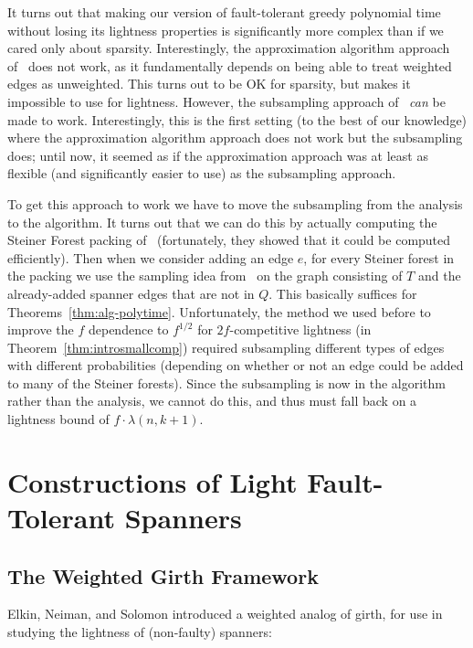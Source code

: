 \documentclass{article}
\theoremstyle{plain}
\theoremstyle{definition}
\begin{document}
It turns out that making our version of fault-tolerant greedy polynomial time without losing its lightness properties is significantly more complex than if we cared only about sparsity.  Interestingly, the approximation algorithm approach of~\cite{DR20} does not work, as it fundamentally depends on being able to treat weighted edges as unweighted.  This turns out to be OK for sparsity, but makes it impossible to use for lightness.  However, the subsampling approach of~\cite{BDR21} \emph{can} be made to work.  Interestingly, this is the first setting (to the best of our knowledge) where the approximation algorithm approach does not work but the subsampling does; until now, it seemed as if the approximation approach was at least as flexible (and significantly easier to use) as the subsampling approach.

To get this approach to work we have to move the subsampling from the analysis to the algorithm.  It turns out that we can do this by actually computing the Steiner Forest packing of~\cite{chekuri2009approximate} (fortunately, they showed that it could be computed efficiently).  Then when we consider adding an edge $e$, for every Steiner forest in the packing we use the sampling idea from~\cite{BDR21} on the graph consisting of $T$ and the already-added spanner edges that are not in $Q$.  This basically suffices for Theorems~\ref{thm:alg-polytime}.  Unfortunately, the method we used before to improve the $f$ dependence to $f^{1/2}$ for $2f$-competitive lightness (in Theorem~\ref{thm:introsmallcomp}) required subsampling different types of edges with different probabilities (depending on whether or not an edge could be added to many of the Steiner forests).  Since the subsampling is now in the algorithm rather than the analysis, we cannot do this, and thus must fall back on a lightness bound of $f \cdot \lambda(n,k+1)$.



\section{Constructions of Light Fault-Tolerant Spanners} \label{sec:upper-main}

\subsection{The Weighted Girth Framework} \label{sec:weighted-girth}

Elkin, Neiman, and Solomon \cite{ENS14} introduced a weighted analog of girth, for use in studying the lightness of (non-faulty) spanners:
\end{document}
